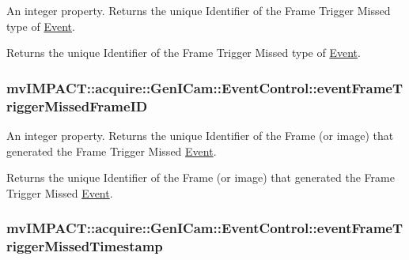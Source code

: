 An integer property. Returns the unique Identifier of the Frame Trigger Missed type of \hyperlink{classmv_i_m_p_a_c_t_1_1acquire_1_1_event}{Event}. 

Returns the unique Identifier of the Frame Trigger Missed type of \hyperlink{classmv_i_m_p_a_c_t_1_1acquire_1_1_event}{Event}. \hypertarget{classmv_i_m_p_a_c_t_1_1acquire_1_1_gen_i_cam_1_1_event_control_a74110a965931172e96039a4b429caa15}{
\subsubsection[{event\+Frame\+Trigger\+Missed\+Frame\+I\+D}]{ mv\+I\+M\+P\+A\+C\+T\+::acquire\+::\+Gen\+I\+Cam\+::\+Event\+Control\+::event\+Frame\+Trigger\+Missed\+Frame\+I\+D}}\label{classmv_i_m_p_a_c_t_1_1acquire_1_1_gen_i_cam_1_1_event_control_a74110a965931172e96039a4b429caa15}


An integer property. Returns the unique Identifier of the Frame (or image) that generated the Frame Trigger Missed \hyperlink{classmv_i_m_p_a_c_t_1_1acquire_1_1_event}{Event}. 

Returns the unique Identifier of the Frame (or image) that generated the Frame Trigger Missed \hyperlink{classmv_i_m_p_a_c_t_1_1acquire_1_1_event}{Event}. \hypertarget{classmv_i_m_p_a_c_t_1_1acquire_1_1_gen_i_cam_1_1_event_control_a6e523687fbcfdf67888f8002071aa134}{
\subsubsection[{event\+Frame\+Trigger\+Missed\+Timestamp}]{ mv\+I\+M\+P\+A\+C\+T\+::acquire\+::\+Gen\+I\+Cam\+::\+Event\+Control\+::event\+Frame\+Trigger\+Missed\+Timestamp}}\label{classmv_i_m_p_a_c_t_1_1acquire_1_1_gen_i_cam_1_1_event_control_a6e523687fbcfdf67888f8002071aa134}



